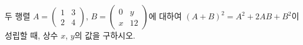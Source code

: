 두 행렬 $A=\begin{pmatrix} 1 & 3 \\ 2 & 4 \end{pmatrix}$, $B=\begin{pmatrix} 0 & y \\ x & 12 \end{pmatrix}$에 대하여 $(A+B)^2=A^2+2AB+B^2$이 성립할 때, 상수 $x$, $y$의 값을 구하시오.
